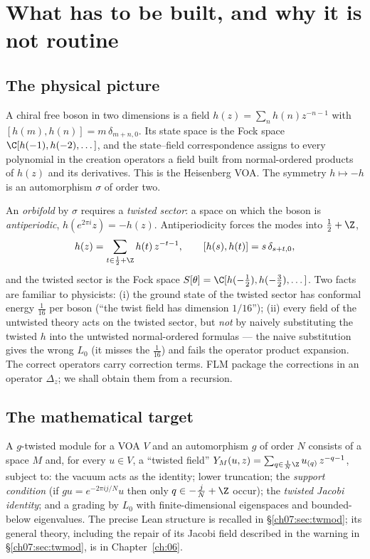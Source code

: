 \section{What has to be built, and why it is not routine}\label{ch07:sec:intro}

\subsection{The physical picture}\label{ch07:sec:physics}

A chiral free boson in two dimensions is a field $h(z) = \sum_n h(n) z^{-n-1}$ with
$[h(m),h(n)] = m\,\delta_{m+n,0}$. Its state space is the Fock space $\C[h(-1),h(-2),\dots]$,
and the state--field correspondence assigns to every polynomial in the creation operators a
field built from normal-ordered products of $h(z)$ and its derivatives. This is the Heisenberg
VOA. The symmetry $h \mapsto -h$ is an automorphism $\sigma$ of order two.

An \emph{orbifold} by $\sigma$ requires a \emph{twisted sector}: a space on which the boson is
\emph{antiperiodic}, $h(e^{2\pi i}z) = -h(z)$. Antiperiodicity forces the modes into $\tfrac12+\Z$,
\begin{equation*}
  h(z) = \sum_{t\in \frac12+\Z} h(t)\,z^{-t-1}, \qquad [h(s),h(t)] = s\,\delta_{s+t,0},
\end{equation*}
and the twisted sector is the Fock space $S[\theta] = \C[h(-\tfrac12),h(-\tfrac32),\dots]$. Two
facts are familiar to physicists: (i) the ground state of the twisted sector has conformal
energy $\tfrac1{16}$ per boson (``the twist field has dimension $1/16$''); (ii) every field of
the untwisted theory acts on the twisted sector, but \emph{not} by naively substituting the
twisted $h$ into the untwisted normal-ordered formulas --- the naive substitution gives the wrong
$L_0$ (it misses the $\tfrac1{16}$) and fails the operator product expansion. The correct
operators carry correction terms. FLM package the corrections in an operator $\Delta_z$; we
shall obtain them from a recursion.

\subsection{The mathematical target}\label{ch07:sec:target}

A $g$-twisted module for a VOA $V$ and an automorphism $g$ of order $N$ consists of a space $M$
and, for every $u\in V$, a ``twisted field''
$Y_M(u,z) = \sum_{q\in \frac1N\Z} u_{(q)}\, z^{-q-1}$, subject to: the vacuum acts as the
identity; lower truncation; the \emph{support condition} (if $g u = e^{-2\pi i j/N} u$ then only
$q\in -\tfrac jN+\Z$ occur); the \emph{twisted Jacobi identity}; and a grading by $L_0$ with
finite-dimensional eigenspaces and bounded-below eigenvalues. The precise Lean structure is
recalled in \S\ref{ch07:sec:twmod}; its general theory, including the repair of its Jacobi field
described in the warning in \S\ref{ch07:sec:twmod}, is in Chapter~\ref{ch:06}.

